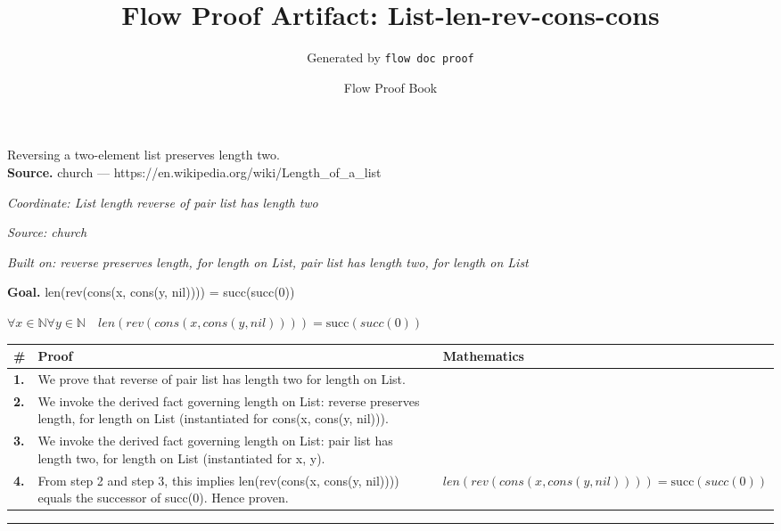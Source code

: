 \documentclass[11pt]{article}
\title{Flow Proof Artifact: List-len-rev-cons-cons}
\author{Generated by \texttt{flow doc proof}}
\date{Flow Proof Book}
\theoremstyle{definition}
\begin{document}
\maketitle
Reversing a two-element list preserves length two.\\[0.5em]
\textbf{Source.} church — https://en.wikipedia.org/wiki/Length\_of\_a\_list\\[0.5em]
\bigskip
{}\par
\smallskip\noindent\textit{Coordinate: List \cdot length \cdot reverse of pair list has length two}\par
\smallskip\noindent\textit{Source: church}\par
\smallskip\noindent\textit{Built on: reverse preserves length, for length on List, pair list has length two, for length on List}\par
\medskip
\noindent\textbf{Goal.} len(rev(cons(x, cons(y, nil)))) = succ(succ(0))\par
\noindent$\displaystyle \forall x \in \mathbb{N} \forall y \in \mathbb{N}\quad len(rev(cons(x, cons(y, nil)))) = \mathrm{succ}(succ(0))$\par
\medskip
\noindent
\begin{tabular}{@{} >{\raggedright\arraybackslash}p{} >{\raggedright\arraybackslash}p{} >{\raggedleft\arraybackslash}p{} @{}}
\textbf{\#} & \textbf{Proof} & \textbf{Mathematics} \\
\midrule
\textbf{1.} & We prove that reverse of pair list has length two for length on List. & \\[0.45em]
\textbf{2.} & We invoke the derived fact governing length on List: reverse preserves length, for length on List (instantiated for cons(x, cons(y, nil))). & \\[0.45em]
\textbf{3.} & We invoke the derived fact governing length on List: pair list has length two, for length on List (instantiated for x, y). & \\[0.45em]
\textbf{4.} & From step 2 and step 3, this implies len(rev(cons(x, cons(y, nil)))) equals the successor of succ(0). Hence proven. & $\displaystyle len(rev(cons(x, cons(y, nil)))) = \mathrm{succ}(succ(0))$ \\[0.45em]
\bottomrule
\end{tabular}
\label{thm:List-length-reverse_of_pair_list_has_length_two}
\par\medskip\hrule
\end{document}
